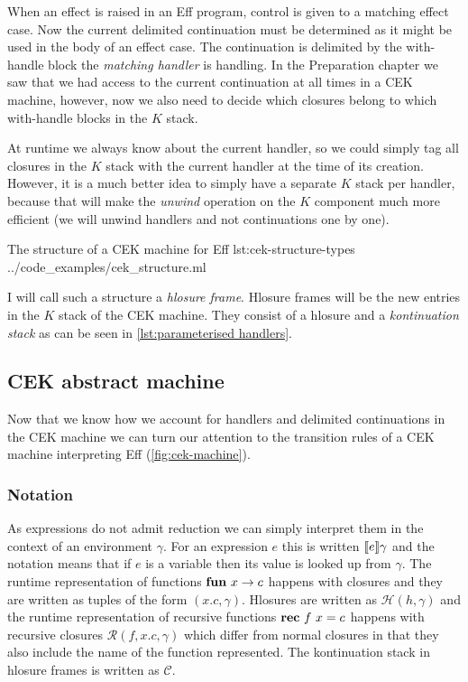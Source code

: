 \documentclass[class=article, crop=false]{standalone}
\begin{document}
When an effect is raised in an Eff program, control is given to a matching
effect case. Now the current delimited continuation must be determined as it
might be used in the body of an effect case. The continuation is delimited by
the with-handle block the \emph{matching handler} is handling. In the
Preparation chapter we saw that we had access to the current continuation at
all times in a CEK machine, however, now we also need to decide which closures
belong to which with-handle blocks in the $K$ stack.

At runtime we always know about the current handler, so we could simply tag all
closures in the $K$ stack with the current handler at the time of its creation.
However, it is a much better idea to simply have a separate $K$ stack per
handler, because that will make the \emph{unwind} operation on the $K$ component
much more efficient (we will unwind handlers and not continuations one by one).

{The structure of a CEK machine for Eff}
{lst:cek-structure-types}
{../code_examples/cek_structure.ml}

I will call such a structure a \emph{hlosure frame}. Hlosure frames will be the
new entries in the $K$ stack of the CEK machine. They consist of a hlosure and
a \emph{kontinuation stack} as can be seen in
\autoref{lst:parameterised handlers}.


\subsection{CEK abstract machine}

Now that we know how we account for handlers and delimited continuations in the
CEK machine we can turn our attention to the transition rules of a CEK machine
interpreting Eff (\autoref{fig:cek-machine}).

\subsubsection{Notation}

As expressions do not admit reduction we can simply interpret them in the
context of an environment $\gamma$. For an expression $e$ this is written
$\llbracket e \rrbracket\gamma$ and the notation means that if $e$ is a variable then its
value is looked up from $\gamma$. The runtime representation of functions
$\mathbf{fun}\  x \to c$ happens with closures and they are written as tuples of the
form $(x.c, \gamma)$. Hlosures are written as $\mathcal{H}(h, \gamma)$ and the
runtime representation of recursive functions $\mathbf{rec}\  f\ x = c$ happens with
recursive closures $\mathcal{R}(f, x.c, \gamma)$ which differ from normal
closures in that they also include the name of the function represented.
The kontinuation stack in hlosure frames is written as $\mathcal{C}$.
\end{document}
